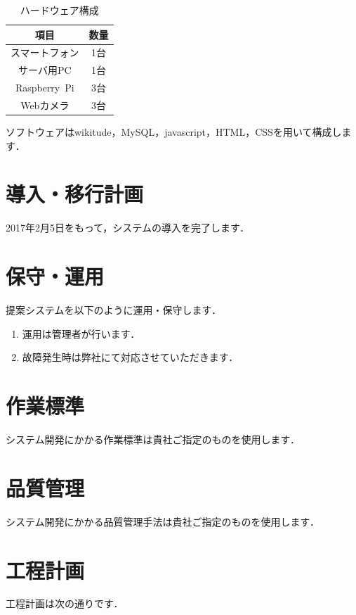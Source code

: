 \documentclass[a4j]{jarticle}
\begin{document}
\begin{table}[H]
	\caption{ハードウェア構成}
	\begin{center}
 		\begin{tabular}{|c|c|}\hline
			項目 & 数量 \\ \hline
			スマートフォン & 1台 \\ \hline
			サーバ用PC & 1台 \\ \hline
			Raspberry~Pi & 3台 \\ \hline
			Webカメラ & 3台\\ \hline
		\end{tabular}
		\label{hardware}
	\end{center}
\end{table}


ソフトウェアはwikitude，MySQL，javascript，HTML，CSSを用いて構成します．

\section{導入・移行計画}
2017年2月5日をもって，システムの導入を完了します．

\section{保守・運用}
提案システムを以下のように運用・保守します．

\begin{enumerate}
	\item 運用は管理者が行います．
	\item 故障発生時は弊社にて対応させていただきます．
\end{enumerate}

\section{作業標準}
システム開発にかかる作業標準は貴社ご指定のものを使用します．

\section{品質管理}
システム開発にかかる品質管理手法は貴社ご指定のものを使用します．

\section{工程計画}
工程計画は次の通りです．\\
\end{document}
